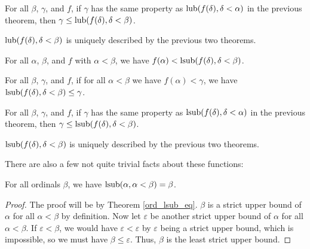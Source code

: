 \documentclass[../../math.tex]{subfiles}
\begin{document}
\begin{theorem} \label{ord_lub_other_leq}
    For all $\beta$, $\gamma$, and $f$, if $\gamma$ has the same property as
    $\operatorname{lub}(f(\delta), \delta < \alpha)$ in the previous theorem, then $\gamma
    \leq \operatorname{lub}(f(\delta), \delta < \beta)$.
\end{theorem}

\begin{theorem} \label{ord_lub_eq}
    $\operatorname{lub}(f(\delta), \delta < \beta)$ is uniquely described by the previous two
    theorems.
\end{theorem}

\begin{theorem} \label{ord_lsub_gt}
    For all $\alpha$, $\beta$, and $f$ with $\alpha < \beta$, we have $f(\alpha)
    < \operatorname{lsub}(f(\delta), \delta < \beta)$.
\end{theorem}

\begin{theorem} \label{ord_lsub_least}
    For all $\beta$, $\gamma$, and $f$, if for all $\alpha < \beta$ we have
    $f(\alpha) < \gamma$, we have $\operatorname{lsub}(f(\delta), \delta < \beta) \leq
    \gamma$.
\end{theorem}

\begin{theorem} \label{ord_lsub_other_leq}
    For all $\beta$, $\gamma$, and $f$, if $\gamma$ has the same property as
    $\operatorname{lsub}(f(\delta), \delta < \alpha)$ in the previous theorem, then $\gamma
    \leq \operatorname{lsub}(f(\delta), \delta < \beta)$.
\end{theorem}

\begin{theorem} \label{ord_lsub_eq}
    $\operatorname{lsub}(f(\delta), \delta < \beta)$ is uniquely described by the previous two
    theorems.
\end{theorem}

There are also a few not quite trivial facts about these functions:

\begin{theorem} \label{ord_lsub_self_eq}
    For all ordinals $\beta$, we have $\operatorname{lsub}(\alpha, \alpha < \beta) = \beta$.
\end{theorem}
\begin{proof}
    The proof will be by Theorem \ref{ord_lsub_eq}.  $\beta$ is a strict upper
    bound of $\alpha$ for all $\alpha < \beta$ by definition.  Now let
    $\varepsilon$ be another strict upper bound of $\alpha$ for all $\alpha <
    \beta$.  If $\varepsilon < \beta$, we would have $\varepsilon < \varepsilon$
    by $\varepsilon$ being a strict upper bound, which is impossible, so we must
    have $\beta \leq \varepsilon$.  Thus, $\beta$ is the least strict upper
    bound.
\end{proof}
\end{document}
